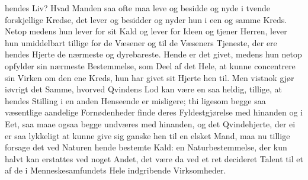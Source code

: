 \documentclass[12pt,a4paper]{book}
\begin{document}
hendes Liv? Hvad Manden saa ofte maa leve og besidde og nyde i tvende
forskjellige Kredse, det lever og besidder og nyder hun i een og samme
Kreds. Netop medens hun lever for sit Kald og lever for Ideen og tjener
Herren, lever hun umiddelbart tillige for de Væsener og til de Væseners
Tjeneste, der ere hendes Hjerte de nærmeste og dyrebareste. Hende er det
givet, medens hun netop opfylder sin nærmeste Bestemmelse, som Deel af
det Hele, at kunne concentrere sin Virken om den ene Kreds, hun har
givet sit Hjerte hen til. Men vistnok gjør iøvrigt det Samme, hvorved
Qvindens Lod kan være en saa heldig, tillige, at hendes Stilling i en
anden Henseende er misligere; thi ligesom begge saa væsentlige aandelige
Fornødenheder finde deres Fyldestgjørelse med hinanden og i Eet, saa
maae ogsaa begge undværes med hinanden, og det Qvindehjerte, der ei er
saa lykkeligt at kunne give sig ganske hen til en elsket Mand, maa nu
tillige forsage det ved Naturen hende bestemte Kald: en Naturbestemmelse,
der kun halvt kan erstattes ved noget Andet, det være da ved et ret
decideret Talent til et af de i Menneskesamfundets Hele indgribende
Virksomheder.
\end{document}
